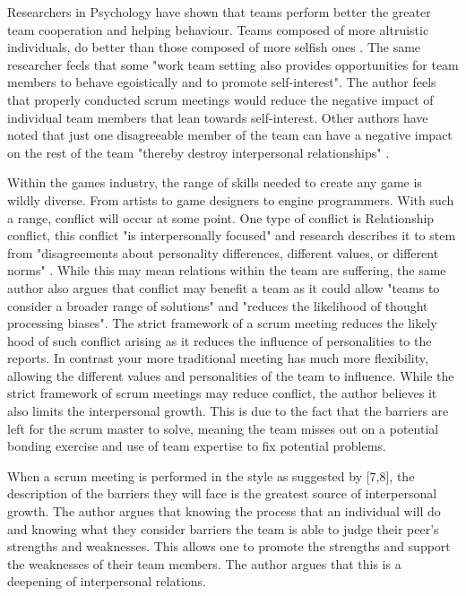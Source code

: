 \documentclass{scrartcl}
\begin{document}
Researchers in Psychology have shown that teams perform better the greater team cooperation and helping behaviour. Teams composed of more altruistic individuals, do better than those composed of more selfish ones \cite[p. x]{li2014toward}.  The same researcher feels that some "work team setting also provides opportunities for team members to behave egoistically and to promote self-interest"\cite[p. x]{li2014toward}. The author feels that properly conducted scrum meetings would reduce the negative impact of individual team members that lean towards self-interest. Other authors have noted that just one disagreeable member of the team can have a negative impact on the rest of the team "thereby destroy interpersonal relationships" \cite[p. x] {barrick1998relating}.

Within the games industry, the range of skills needed to create any game is wildly diverse. From artists to game designers to engine programmers. With such a range, conflict will occur at some point\cite{gorse2007communication}. One type of conflict is Relationship conflict, this conflict "is interpersonally focused" \cite [p. x]{costa2015direct} and research describes it to stem from "disagreements about personality differences, different values, or different norms" \cite [p. x]{costa2015direct}. While this may mean relations within the team are suffering, the same author also argues that conflict may benefit a team as it could allow "teams to consider a broader range of solutions" and "reduces the likelihood of thought processing biases"\cite [p. x]{costa2015direct}. The strict framework of a scrum meeting reduces the likely hood of such conflict arising as it reduces the influence of personalities to the reports. In contrast your more traditional meeting has much more flexibility, allowing the different values and personalities of the team to influence. While the strict framework of scrum meetings may reduce conflict, the author believes it also limits the interpersonal growth. This is due to the fact that the barriers are left for the scrum master to solve, meaning the team misses out on a potential bonding exercise and use of team expertise to fix potential problems.

When a scrum meeting is performed in the style as suggested by [7,8], the description of the barriers they will face is the greatest source of interpersonal growth. The author argues that knowing the process that an individual will do and knowing what they consider barriers the team is able to judge their peer’s strengths and weaknesses. This allows one to promote the strengths and support the weaknesses of their team members. The author argues that this is a deepening of interpersonal relations.
\end{document}
